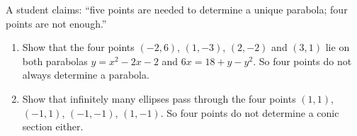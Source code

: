 A student claims: ``five points are needed to determine a unique parabola; four points are not enough.''
\begin{enumerate}
\item[(a)] Show that the four points $(-2,6)$, $(1,-3)$, $(2,-2)$ and $(3,1)$ lie on both parabolas $y=x^2-2x-2$ and $6x=18+y-y^2$. So four points do not always determine a parabola.
\item[(b)] Show that infinitely many ellipses pass through the four points $(1,1)$, $(-1,1)$, $(-1,-1)$, $(1,-1)$. So four points do not determine a conic section either.
\end{enumerate}
